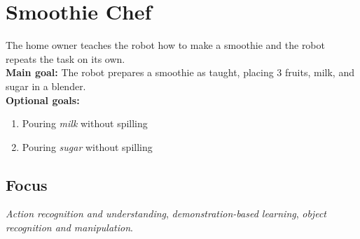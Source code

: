 \section{Smoothie Chef}
\label{test:smoothie-chef}
The home owner teaches the robot how to make a smoothie and the robot repeats the task on its own.\\

\noindent \textbf{Main goal:} The robot prepares a smoothie as taught, placing 3 fruits, milk, and sugar in a blender.\\

\noindent \textbf{Optional goals:}
\begin{enumerate}[nosep]
	\item Pouring \emph{milk} without spilling
	\item Pouring \emph{sugar} without spilling
\end{enumerate}


\subsection*{Focus}
\emph{Action recognition and understanding}, \emph{demonstration-based learning}, \emph{object recognition and manipulation}.

